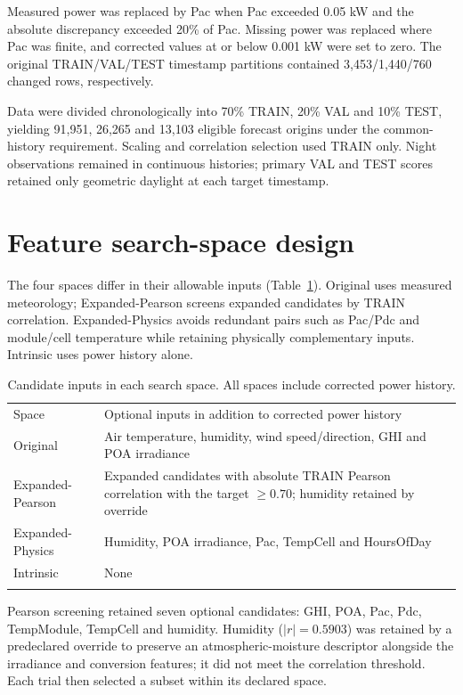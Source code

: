 \documentclass[10pt,a4paper]{article}
\newcommand{\toprule}{\noalign{\hrule height .7pt\vskip3pt}}
\newcommand{\midrule}{\noalign{\vskip2pt\hrule height .4pt\vskip2pt}}
\newcommand{\bottomrule}{\noalign{\vskip3pt\hrule height .7pt}}
\begin{document}
Measured power was replaced by Pac when Pac exceeded 0.05 kW and the absolute discrepancy exceeded 20\% of Pac. Missing power was replaced where Pac was finite, and corrected values at or below 0.001 kW were set to zero. The original TRAIN/VAL/TEST timestamp partitions contained 3,453/1,440/760 changed rows, respectively.

Data were divided chronologically into 70\% TRAIN, 20\% VAL and 10\% TEST, yielding 91,951, 26,265 and 13,103 eligible forecast origins under the common-history requirement. Scaling and correlation selection used TRAIN only. Night observations remained in continuous histories; primary VAL and TEST scores retained only geometric daylight at each target timestamp.

\section{Feature search-space design}
The four spaces differ in their allowable inputs (Table~\ref{tab:spaces}). Original uses measured meteorology; Expanded-Pearson screens expanded candidates by TRAIN correlation. Expanded-Physics avoids redundant pairs such as Pac/Pdc and module/cell temperature while retaining physically complementary inputs. Intrinsic uses power history alone.

\begin{table}[htbp]
\centering\small
\begin{tabular}{@{}lp{11.5cm}@{}}\toprule
Space & Optional inputs in addition to corrected power history \\\midrule
Original & Air temperature, humidity, wind speed/direction, GHI and POA irradiance \\
Expanded-Pearson & Expanded candidates with absolute TRAIN Pearson correlation with the target $\geq 0.70$; humidity retained by override \\
Expanded-Physics & Humidity, POA irradiance, Pac, TempCell and HoursOfDay \\
Intrinsic & None \\\bottomrule
\end{tabular}
\caption{Candidate inputs in each search space. All spaces include corrected power history.}\label{tab:spaces}
\end{table}

Pearson screening retained seven optional candidates: GHI, POA, Pac, Pdc, TempModule, TempCell and humidity. Humidity ($|r|=0.5903$) was retained by a predeclared override to preserve an atmospheric-moisture descriptor alongside the irradiance and conversion features; it did not meet the correlation threshold. Each trial then selected a subset within its declared space.
\end{document}
